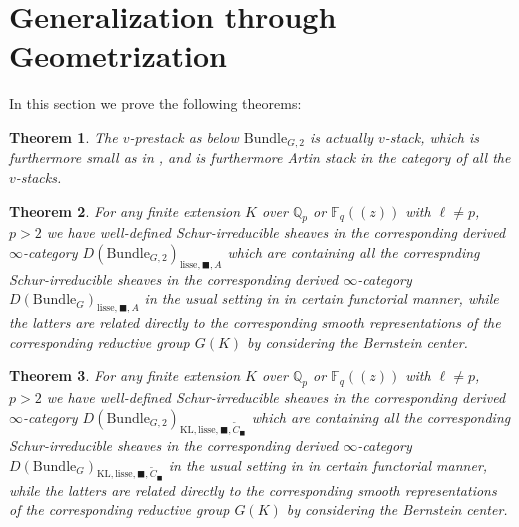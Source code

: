 \documentclass[12pt]{book}
\newtheorem{theorem}{Theorem}
\theoremstyle{definition}
\begin{document}
\section{Generalization through Geometrization}

\noindent In this section we prove the following theorems:

\begin{theorem}
The $v$-prestack as below $\mathrm{Bundle}_{G,2}$ is actually $v$-stack, which is furthermore small as in \cite{FS}, and is furthermore Artin stack in the category of all the $v$-stacks.
\end{theorem}

\begin{theorem}
For any finite extension $K$ over $\mathbb{Q}_p$ or $\mathbb{F}_q((z))$ with $\ell\neq p$, $p>2$ we have well-defined Schur-irreducible sheaves in the corresponding derived $\infty$-category $D(\mathrm{Bundle}_{G,2})_{\text{lisse},\blacksquare,A}$ which are containing all the correspnding Schur-irreducible sheaves in the corresponding derived $\infty$-category $D(\mathrm{Bundle}_{G})_{\text{lisse},\blacksquare,A}$ in the usual setting in \cite{FS} in certain functorial manner, while the latters are related directly to the corresponding smooth representations of the corresponding reductive group $G(K)$ by considering the Bernstein center.
\end{theorem}

\begin{theorem}
For any finite extension $K$ over $\mathbb{Q}_p$ or $\mathbb{F}_q((z))$ with $\ell\neq p$, $p>2$ we have well-defined Schur-irreducible sheaves in the corresponding derived $\infty$-category $D(\mathrm{Bundle}_{G,2})_{\text{KL},\mathrm{lisse},\blacksquare,\widetilde{C}_\blacksquare}$ which are containing all the corresponding Schur-irreducible sheaves in the corresponding derived $\infty$-category $D(\mathrm{Bundle}_{G})_{\text{KL},\mathrm{lisse},\blacksquare,\widetilde{C}_\blacksquare}$ in the usual setting in \cite{FS} in certain functorial manner, while the latters are related directly to the corresponding smooth representations of the corresponding reductive group $G(K)$ by considering the Bernstein center.
\end{theorem}
\end{document}
